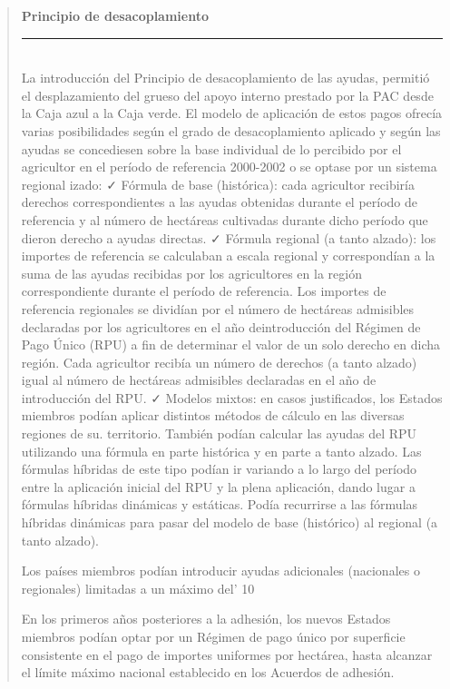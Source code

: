 \documentclass[10pt,a4paper]{article}
\newenvironment{specialblock}[1]{%
      \begin{quote} %
      \small %
      \noindent\textbf{#1}\\[-0.3em] %
      \rule{\linewidth}{0.4pt}\\[0.6em]}{
      \end{quote}}
\begin{document}
\begin{specialblock}{Principio de desacoplamiento}
    La introducción del Principio de desacoplamiento de las ayudas, permitió el desplazamiento del grueso del apoyo interno prestado por la PAC desde la Caja azul a la Caja verde. El modelo de aplicación de estos pagos ofrecía varias posibilidades según el grado de desacoplamiento aplicado y según las ayudas se concediesen sobre la base individual de lo percibido por el agricultor en el período de referencia 2000-2002 o se optase por un sistema regional izado:
    ✓ Fórmula de base (histórica): cada agricultor recibiría derechos correspondientes a las ayudas obtenidas durante el período de referencia y al número de hectáreas cultivadas durante dicho período que dieron derecho a ayudas directas. 
    ✓ Fórmula regional (a tanto alzado): los importes de referencia se calculaban a escala regional y correspondían a la suma de las ayudas recibidas por los agricultores en la región correspondiente durante el período de referencia. Los importes de referencia regionales se dividían por el número de hectáreas admisibles declaradas por los agricultores en el año deintroducción del Régimen de Pago Único (RPU) a fin de determinar el valor de un solo derecho en dicha región. Cada agricultor recibía un número de derechos (a tanto alzado) igual al número de hectáreas admisibles declaradas en el año de introducción del RPU.
    ✓ Modelos mixtos: en casos justificados, los Estados miembros podían aplicar distintos métodos de cálculo en las diversas regiones de su. territorio. También podían calcular las ayudas del RPU utilizando una fórmula en parte histórica y en parte a tanto alzado. Las fórmulas híbridas de este tipo podían ir variando a lo largo del período entre la aplicación inicial del RPU y la plena aplicación, dando lugar a fórmulas híbridas dinámicas y estáticas. Podía recurrirse a las fórmulas híbridas dinámicas para pasar del modelo de base (histórico) al regional (a tanto alzado).
    
    Los países miembros podían introducir ayudas adicionales (nacionales o regionales) limitadas a un máximo del' 10%
    
    En los primeros años posteriores a la adhesión, los nuevos Estados miembros podían optar por un Régimen de pago único por superficie consistente en el pago de importes uniformes por hectárea, hasta alcanzar el límite máximo nacional establecido en los Acuerdos de adhesión. 
    

\end{specialblock}
\end{document}
